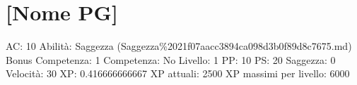 \section{{[}Nome PG{]}}\label{nome-pg}

AC: 10 Abilità: Saggezza
(Saggezza\%2021f07aacc3894ca098d3b0f89d8c7675.md) Bonus Competenza: 1
Competenza: No Livello: 1 PP: 10 PS: 20 Saggezza: 0 Velocità: 30 XP:
0.416666666667 XP attuali: 2500 XP massimi per livello: 6000
